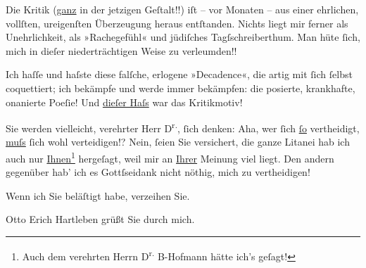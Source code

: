 \pstart
           Die Kritik (\uline{ganz} in der jetzigen Geſtalt!!) iſt – vor Monaten – aus einer ehrlichen,
          vollſten, ureigenſten Überzeugung heraus entſtanden. Nichts liegt mir ferner als
          Unehrlichkeit, als »Rachegefühl« und jüdiſches Tagſschreiberthum. Man hüte{ }ſich, mich in
          dieſer niederträchtigen Weise zu verleumden!!\pend
           
\pstart
           Ich haſſe und haſste diese falſche, erlogene »Decadence«, die artig mit{ }ſich{ }ſelbst
          coquettiert; ich bekämpfe und werde immer bekämpfen: die posierte, krankhafte, onanierte
          Poeſie! {\pb}Und \uline{dieſer
            Haſs} war das Kritikmotiv!\pend
           
\pstart
            Sie werden vielleicht, verehrter Herr D\textsuperscript{r.},{ }ſich denken: Aha, wer{ }ſich \uline{ſo} vertheidigt, \uline{muſs}{ }{ }ſich wohl verteidigen!?  Nein,{ }ſeien Sie versichert, die ganze Litanei hab ich auch nur \uline{Ihnen}\footnote{\noindent{}Auch dem verehrten Herrn D\textsuperscript{r.}{ }B-Hofmann hätte ich’s geſagt!} hergeſagt, weil mir an \uline{Ihrer} Meinung  viel liegt. Den andern gegenüber hab’ ich es Gottſseidank
          nicht nöthig, mich zu vertheidigen!\pend
           
\pstart
           Wenn ich Sie beläſtigt habe, verzeihen Sie.\pend
           
\pstart
           Otto Erich Hartleben grüßt Sie durch mich.\pend
           
